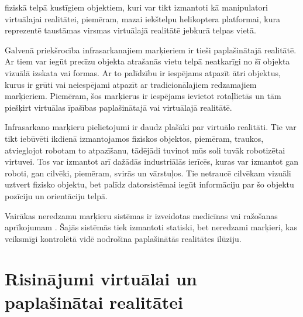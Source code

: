 \documentclass[12pt, a4paper, oneside, openright]{article}
\begin{document}
fiziskā telpā kustīgiem objektiem, kuri var tikt izmantoti kā manipulatori virtuālajai realitātei, piemēram,
mazai iekštelpu helikoptera platformai, kura reprezentē taustāmas virsmas virtuālajā realitātē 
jebkurā telpas vietā.
\par
Galvenā priekšrocība infrasarkanajiem marķieriem ir tieši paplašinātajā realitātē. 
Ar tiem var iegūt precīzu objekta atrašanās vietu telpā neatkarīgi no 
šī objekta vizuālā izskata vai formas. Ar to palīdzību ir iespējams atpazīt ātri objektus, kurus
ir grūti vai neiespējami atpazīt ar tradicionālajiem redzamajiem marķieriem. Piemēram, šos
marķierus ir iespējams ievietot rotaļlietās un tām piešķirt virtuālas īpašības paplašinātajā 
vai virtuālajā realitātē.

\par
Infrasarkano marķieru pielietojumi ir daudz plašāki par virtuālo realitāti.
Tie var tikt iebūvēti ikdienā izmantojamos fiziskos objektos, piemēram, traukos,
atvieglojot robotam to atpazīšanu, tādējādi tuvinot mūs soli tuvāk robotizētai virtuvei.
Tos var izmantot arī dažādās industriālās ierīcēs, kuras var izmantot gan roboti, gan cilvēki,
piemēram, svirās un vārstuļos. Tie netraucē cilvēkam vizuāli uztvert fizisko objektu, 
bet palīdz datorsistēmai iegūt informāciju par šo objektu pozīciju un orientāciju telpā.

\par 
Vairākas neredzamu marķieru sistēmas ir izveidotas medicīnas vai ražošanas aprīkojumam \cite{WeiLiu2014} \cite{BMWServices2014}.
Šajās sistēmās tiek izmantoti statiski, bet neredzami marķieri, kas veiksmīgi kontrolētā vidē nodrošina paplašinātās
realitātes ilūziju.


\newpage
\section{Risinājumi virtuālai un paplašinātai realitātei}
\end{document}
